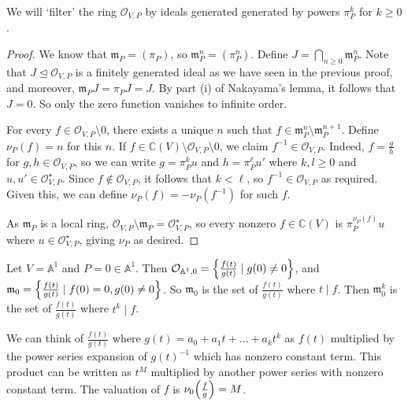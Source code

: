We will `filter' the ring \( \mathcal O_{V,P} \) by ideals generated generated by powers \( \pi_P^k \) for \( k \geq 0 \).
\begin{proof}
    We know that \( \mathfrak m_P = (\pi_P) \), so \( \mathfrak m_P^n = (\pi_P^n) \).
    Define \( J = \bigcap_{n \geq 0} \mathfrak m_P^n \).
    Note that \( J \trianglelefteq \mathcal O_{V,P} \) is a finitely generated ideal as we have seen in the previous proof, and moreover, \( \mathfrak m_P J = \pi_P J = J \).
    By part (i) of Nakayama's lemma, it follows that \( J = 0 \).
    So only the zero function vanishes to infinite order.

    For every \( f \in \mathcal O_{V,P} \setminus \qty{0} \), there exists a unique \( n \) such that \( f \in \mathfrak m_P^n \setminus \mathfrak m_P^{n+1} \).
    Define \( \nu_P(f) = n \) for this \( n \).
    If \( f \in \mathbb C(V) \setminus \mathcal O_{V,P} \setminus \qty{0} \), we claim \( f^{-1} \in \mathcal O_{V,P} \).
    Indeed, \( f = \frac{g}{h} \) for \( g, h \in \mathcal O_{V,P} \), so we can write \( g = \pi_P^k u \) and \( h = \pi_P^\ell u' \) where \( k, l \geq 0 \) and \( u, u' \in \mathcal O_{V,P}^\star \).
    Since \( f \not\in \mathcal O_{V,P} \), it follows that \( k < \ell \), so \( f^{-1} \in \mathcal O_{V,P} \) as required.
    Given this, we can define \( \nu_P(f) = -\nu_P(f^{-1}) \) for such \( f \).
    
    As \( \mathfrak m_P \) is a local ring, \( \mathcal O_{V,P} \setminus \mathfrak m_P = \mathcal O_{V,P}^\star \), so every nonzero \( f \in \mathbb C(V) \) is \( \pi_P^{\nu_P(f)} u \) where \( u \in \mathcal O_{V,P}^\star \), giving \( \nu_P \) as desired.
\end{proof}
\begin{example}
    Let \( V = \mathbb A^1 \) and \( P = 0 \in \mathbb A^1 \).
    Then \( \mathcal O_{\mathbb A^1,0} = \qty{\frac{f(t)}{g(t)} \mid g(0) \neq 0} \), and \( \mathfrak m_0 = \qty{\frac{f(t)}{g(t)} \mid f(0) = 0, g(0) \neq 0} \).
    So \( \mathfrak m_0 \) is the set of \( \frac{f(t)}{g(t)} \) where \( t \mid f \).
    Then \( \mathfrak m_0^k \) is the set of \( \frac{f(t)}{g(t)} \) where \( t^k \mid f \).
    
    We can think of \( \frac{f(t)}{g(t)} \) where \( g(t) = a_0 + a_1t + \dots + a_k t^k \) as \( f(t) \) multiplied by the power series expansion of \( g(t)^{-1} \) which has nonzero constant term.
    This product can be written as \( t^M \) multiplied by another power series with nonzero constant term.
    The valuation of \( f \) is \( \nu_0\qty(\frac{f}{g}) = M \).
\end{example}
